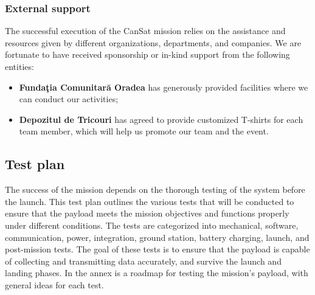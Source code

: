 \subsubsection{External support}
The successful execution of the CanSat mission relies on the assistance and resources given by different organizations, departments, and companies. We are fortunate to have received sponsorship or in-kind support from the following entities:
\begin{itemize}[leftmargin=1cm, itemindent=0.25cm, noitemsep, topsep=0pt, label=$\bullet$]
    \item \textbf{Funda\c{t}ia Comunitar\u{a} Oradea} has generously provided facilities where we can conduct our activities;
    \item \textbf{Depozitul de Tricouri} has agreed to provide customized T-shirts for each team member, which will help us promote our team and the event.
\end{itemize}


\subsection{Test plan}

The success of the mission depends on the thorough testing of the system before the launch. This test plan outlines the various tests that will be conducted to ensure that the payload meets the mission objectives and functions properly under different conditions. The tests are categorized into mechanical, software, communication, power, integration, ground station, battery charging, launch, and post-mission tests. The goal of these tests is to ensure that the payload is capable of collecting and transmitting data accurately, and survive the launch and landing phases. In the annex is a roadmap for testing the mission's payload, with general ideas for each test.


